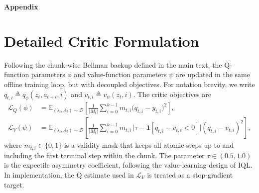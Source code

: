 \documentclass{article}
\begin{document}

\newpage
\centerline{\Large\bfseries Appendix}
\vspace{1em} 

\section{Detailed Critic Formulation}
\label{sec:critic_objectives}
Following the chunk-wise Bellman backup defined in the main text, the Q-function parameters $\phi$ and value-function parameters $\psi$ are updated in the same offline training loop, but with decoupled objectives. For notation brevity, we write $q_{t,i} \triangleq q_\phi(z_t,a_{t+i},i)$ and $v_{t,i} \triangleq v_\psi(z_t,i)$. The critic objectives are
\begin{align}
\mathcal{L}_Q(\phi) &= \mathbb{E}_{(s_t,A_t)\sim\mathcal D} \left[ \frac{1}{|M_t|} \sum_{i=0}^{k-1} m_{t,i} \bigl(q_{t,i}-y_{t,i}\bigr)^2 \right], \\
\mathcal{L}_V(\psi) &= \mathbb{E}_{(s_t,A_t)\sim\mathcal D} \left[ \frac{1}{|M_t|} \sum_{i=0}^{k-1} m_{t,i}\,\bigl|\tau-\mathbf{1}[q_{t,i}-v_{t,i}<0]\bigr| (q_{t,i}-v_{t,i})^2 \right],
\end{align}
where $m_{t,i}\in\{0,1\}$ is a validity mask that keeps all atomic steps up to and including the first terminal step within the chunk. The parameter $\tau\in(0.5,1.0)$ is the expectile asymmetry coefficient, following the value-learning design of IQL. In implementation, the Q estimate used in $\mathcal{L}_V$ is treated as a stop-gradient target.
\end{document}

